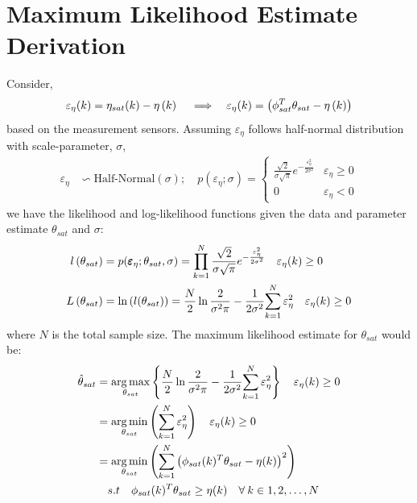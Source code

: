 \section{Maximum Likelihood Estimate Derivation \label{sec::mle_derivation}}
Consider,
\begin{align}
        \varepsilon_\eta(k) & = \eta_{sat}(k) - \eta\left( k \right)  \quad
        \implies            & \varepsilon_\eta(k) = \left( \phi_{sat}^T \theta_{sat} - \eta \left( k \right) \right) \label{eqn::eta_regression}
\end{align}
based on the measurement sensors. Assuming $\varepsilon_\eta$ follows half-normal distribution \cite{byers2014half} with scale-parameter, $\sigma$,
\begin{align}
        \varepsilon_\eta & \backsim \text{Half-Normal}(\sigma);\quad
        p(\varepsilon_\eta;\sigma) = \begin{cases} \frac{\sqrt{2}}{\sigma \sqrt{\pi}} e^{- \frac{\varepsilon_\eta^2}{2 \sigma^2}} & \varepsilon_\eta \geq  0 \\
              0                                                                              & \varepsilon_{\eta} < 0
                                     \end{cases}
        \label{eqn::exp_pdf}
\end{align}
we have the likelihood and log-likelihood functions given the data and parameter estimate $\theta_{sat}$ and $\sigma$:
\begin{align}
        l\left( \theta_{sat} \right) & =p(\pmb \varepsilon_{\eta};\theta_{sat}, \sigma) = \prod_{k=1}^N  \frac{\sqrt{2}}{\sigma \sqrt{\pi}} e^{- \frac{\varepsilon_\eta^2}{2 \sigma^2}} \quad \varepsilon_\eta(k) \geq  0
        \label{eqn::likelihood}                                                                                                                                                                                 \\
        L\left( \theta_{sat} \right) & =\ln \left( l(\theta_{sat}) \right) = \frac{N}{2} \ln \frac{2}{\sigma^2 \pi} - \frac{1}{2 \sigma^2} {\sum_{k=1}^N \varepsilon_\eta^2}
        \quad \varepsilon_\eta(k) \geq  0
        \label{eqn::log_likelihood}
\end{align}
where $N$ is the total sample size. The maximum likelihood estimate for $\theta_{sat}$ would be:
\begin{align}
        \hat \theta_{sat}
         & = \operatorname*{arg\,max}_{\theta_{sat}} \left\{  \frac{N}{2} \ln \frac{2}{\sigma^2 \pi} - \frac{1}{2 \sigma^2} {\sum_{k=1}^N \varepsilon_\eta^2}  \right\} \quad \varepsilon_\eta(k) \geq  0 \notag \\
         & = \operatorname*{arg\,min}_{\theta_{sat}} \left( \sum_{k=1}^N \varepsilon_\eta^2 \right) \quad \varepsilon_\eta(k) \geq  0 \notag                                                                    \\
         & = \operatorname*{arg\,min}_{\theta_{sat}} \left( \sum_{k=1}^N \left( \phi_{sat}(k)^T \theta_{sat} - \eta(k) \right)^2 \right) \notag                                                                           \\
         & \quad  s.t \quad \phi_{sat}(k)^T \theta_{sat} \geq \eta(k) \quad \forall \: k \in {1,2, \hdots, N}
        \label{eqn::quad_prog}
\end{align}
